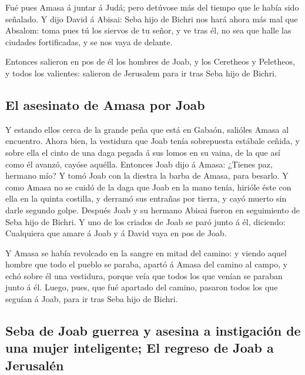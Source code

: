  Fué pues Amasa á juntar á Judá; pero detúvose más del
tiempo que le había sido señalado.  Y dijo David á Abisai:
Seba hijo de Bichri nos hará ahora más mal que Absalom: toma pues tú los
siervos de tu señor, y ve tras él, no sea que halle las ciudades
fortificadas, y se nos vaya de delante.

 Entonces salieron en pos de él los hombres de Joab, y los
Ceretheos y Peletheos, y todos los valientes: salieron de Jerusalem para
ir tras Seba hijo de Bichri.

\hypertarget{el-asesinato-de-amasa-por-joab}{%
\subsection{El asesinato de Amasa por
Joab}\label{el-asesinato-de-amasa-por-joab}}

 Y estando ellos cerca de la grande peña que está en Gabaón,
salióles Amasa al encuentro. Ahora bien, la vestidura que Joab tenía
sobrepuesta estábale ceñida, y sobre ella el cinto de una daga pegada á
sus lomos en su vaina, de la que así como él avanzó, cayóse aquélla.
 Entonces Joab dijo á Amasa: ¿Tienes paz, hermano mío? Y
tomó Joab con la diestra la barba de Amasa, para besarlo. 
Y como Amasa no se cuidó de la daga que Joab en la mano tenía, hirióle
éste con ella en la quinta costilla, y derramó sus entrañas por tierra,
y cayó muerto sin darle segundo golpe. Después Joab y su hermano Abisai
fueron en seguimiento de Seba hijo de Bichri.  Y uno de los
criados de Joab se paró junto á él, diciendo: Cualquiera que amare á
Joab y á David vaya en pos de Joab.

 Y Amasa se había revolcado en la sangre en mitad del
camino: y viendo aquel hombre que todo el pueblo se paraba, apartó á
Amasa del camino al campo, y echó sobre él una vestidura, porque veía
que todos los que venían se paraban junto á él.  Luego,
pues, que fué apartado del camino, pasaron todos los que seguían á Joab,
para ir tras Seba hijo de Bichri.

\hypertarget{seba-de-joab-guerrea-y-asesina-a-instigaciuxf3n-de-una-mujer-inteligente-el-regreso-de-joab-a-jerusaluxe9n}{%
\subsection{Seba de Joab guerrea y asesina a instigación de una mujer
inteligente; El regreso de Joab a
Jerusalén}\label{seba-de-joab-guerrea-y-asesina-a-instigaciuxf3n-de-una-mujer-inteligente-el-regreso-de-joab-a-jerusaluxe9n}}

